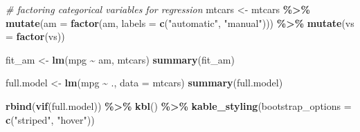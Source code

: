 \documentclass[
]{article}
\newenvironment{Shaded}{\begin{snugshade}}{\end{snugshade}}
\newcommand{\AttributeTok}[1]{\textcolor[rgb]{0.13,0.29,0.53}{#1}}
\newcommand{\CommentTok}[1]{\textcolor[rgb]{0.56,0.35,0.01}{\textit{#1}}}
\newcommand{\FunctionTok}[1]{\textcolor[rgb]{0.13,0.29,0.53}{\textbf{#1}}}
\newcommand{\NormalTok}[1]{#1}
\newcommand{\OtherTok}[1]{\textcolor[rgb]{0.56,0.35,0.01}{#1}}
\newcommand{\SpecialCharTok}[1]{\textcolor[rgb]{0.81,0.36,0.00}{\textbf{#1}}}
\newcommand{\StringTok}[1]{\textcolor[rgb]{0.31,0.60,0.02}{#1}}
\begin{document}
\begin{Shaded}
\begin{Highlighting}[]
\CommentTok{\# factoring categorical variables for regression}
\NormalTok{mtcars }\OtherTok{\textless{}{-}}\NormalTok{ mtcars }\SpecialCharTok{\%\textgreater{}\%}
    \FunctionTok{mutate}\NormalTok{(}\AttributeTok{am =} \FunctionTok{factor}\NormalTok{(am, }\AttributeTok{labels =} \FunctionTok{c}\NormalTok{(}\StringTok{"automatic"}\NormalTok{, }\StringTok{"manual"}\NormalTok{))) }\SpecialCharTok{\%\textgreater{}\%}
    \FunctionTok{mutate}\NormalTok{(}\AttributeTok{vs =} \FunctionTok{factor}\NormalTok{(vs))}
\end{Highlighting}
\end{Shaded}

\begin{Shaded}
\end{Shaded}

\begin{Shaded}
\begin{Highlighting}[]
\NormalTok{fit\_am }\OtherTok{\textless{}{-}} \FunctionTok{lm}\NormalTok{(mpg }\SpecialCharTok{\textasciitilde{}}\NormalTok{ am, mtcars)}
\FunctionTok{summary}\NormalTok{(fit\_am) }
\end{Highlighting}
\end{Shaded}

\begin{Shaded}
\begin{Highlighting}[]
\NormalTok{full.model }\OtherTok{\textless{}{-}} \FunctionTok{lm}\NormalTok{(mpg }\SpecialCharTok{\textasciitilde{}}\NormalTok{ ., }\AttributeTok{data =}\NormalTok{ mtcars)}
\FunctionTok{summary}\NormalTok{(full.model) }
\end{Highlighting}
\end{Shaded}

\begin{Shaded}
\begin{Highlighting}[]
\FunctionTok{rbind}\NormalTok{(}\FunctionTok{vif}\NormalTok{(full.model))  }\SpecialCharTok{\%\textgreater{}\%}
  \FunctionTok{kbl}\NormalTok{() }\SpecialCharTok{\%\textgreater{}\%}
  \FunctionTok{kable\_styling}\NormalTok{(}\AttributeTok{bootstrap\_options =} \FunctionTok{c}\NormalTok{(}\StringTok{"striped"}\NormalTok{, }\StringTok{"hover"}\NormalTok{))}
\end{Highlighting}
\end{Shaded}
\end{document}

